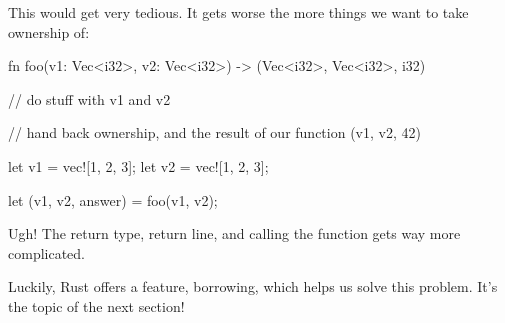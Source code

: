 This would get very tedious. It gets worse the more things we want to take ownership of:

\begin{rustc}
fn foo(v1: Vec<i32>, v2: Vec<i32>) -> (Vec<i32>, Vec<i32>, i32) {
    // do stuff with v1 and v2

    // hand back ownership, and the result of our function
    (v1, v2, 42)
}

let v1 = vec![1, 2, 3];
let v2 = vec![1, 2, 3];

let (v1, v2, answer) = foo(v1, v2);
\end{rustc}

Ugh! The return type, return line, and calling the function gets way more complicated.

\blank

Luckily, Rust offers a feature, borrowing, which helps us solve this problem. It's the topic of the next section!
